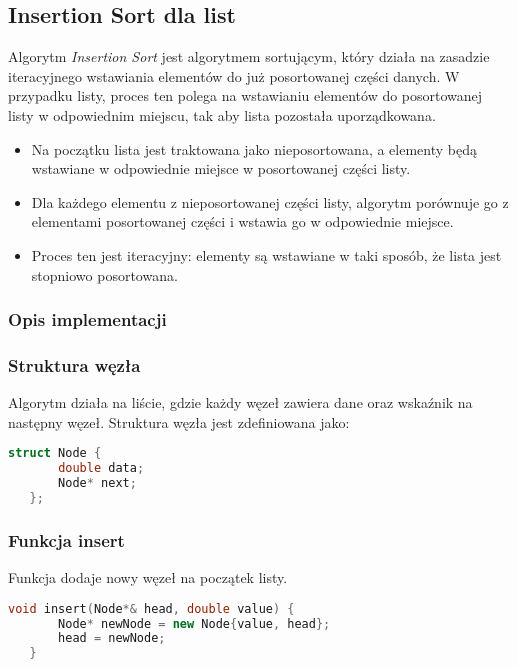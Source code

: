 \documentclass[a4paper,12pt]{article}
\begin{document}
\subsection{Insertion Sort dla list}
Algorytm \textit{Insertion Sort} jest algorytmem sortującym, który działa na zasadzie iteracyjnego wstawiania elementów do już posortowanej części danych. W przypadku listy, proces ten polega na wstawianiu elementów do posortowanej listy w odpowiednim miejscu, tak aby lista pozostała uporządkowana.

\begin{itemize}
    \item Na początku lista jest traktowana jako nieposortowana, a elementy będą wstawiane w odpowiednie miejsce w posortowanej części listy.
    \item Dla każdego elementu z nieposortowanej części listy, algorytm porównuje go z elementami posortowanej części i wstawia go w odpowiednie miejsce.
    \item Proces ten jest iteracyjny: elementy są wstawiane w taki sposób, że lista jest stopniowo posortowana.
\end{itemize}

\subsubsection{Opis implementacji}
\subsubsection{Struktura węzła}
   Algorytm działa na liście, gdzie każdy węzeł zawiera dane oraz wskaźnik na następny węzeł. Struktura węzła jest zdefiniowana jako:
   \begin{lstlisting}[language=C++]
   struct Node {
       double data;
       Node* next;
   };
   \end{lstlisting}

\subsubsection{Funkcja insert}
   Funkcja dodaje nowy węzeł na początek listy.
   \begin{lstlisting}[language=C++]
   void insert(Node*& head, double value) {
       Node* newNode = new Node{value, head};
       head = newNode;
   }
   \end{lstlisting}
\end{document}
